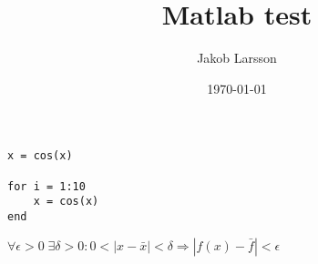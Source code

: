 \documentclass{article}
\begin{document}
\date{\today}
\title{Matlab test}
\author{Jakob Larsson}
\maketitle

\begin{verbatim}
x = cos(x)

for i = 1:10
    x = cos(x)
end
\end{verbatim}

$ \forall \epsilon > 0 \;  \exists \delta > 0 : 0 < |x- \bar{x}| < \delta \Rightarrow
  |f(x) - \bar{f}| < \epsilon$
\end{document}
